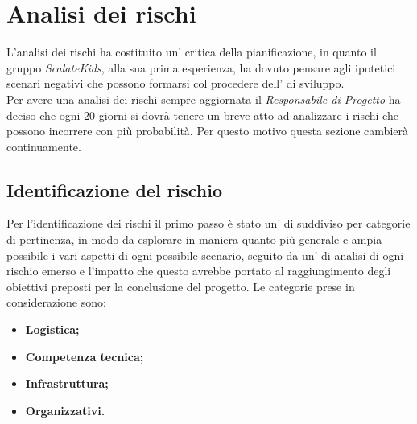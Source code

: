 \documentclass{scalatekids-article}
\begin{document}
\section{Analisi dei rischi}
L'analisi dei rischi ha costituito un' critica della pianificazione, in
quanto il gruppo \textit{ScalateKids}, alla sua prima esperienza, ha dovuto pensare agli ipotetici
scenari negativi che possono formarsi col procedere dell' di sviluppo.\\
Per avere una analisi dei rischi sempre aggiornata il \textit{Responsabile di Progetto} ha deciso che ogni 20 giorni si dovrà tenere un breve  atto ad analizzare i rischi che possono incorrere con più probabilità. Per questo motivo questa sezione cambierà continuamente.\\
\subsection{Identificazione del rischio}
Per l'identificazione dei rischi il primo passo è stato un' di
 suddiviso per categorie di pertinenza, in modo da esplorare
in maniera quanto più generale e ampia possibile i vari aspetti di ogni
possibile scenario, seguito da un' di analisi di ogni rischio emerso e
l'impatto che questo avrebbe portato al raggiungimento degli obiettivi preposti
per la conclusione del progetto. Le categorie prese in considerazione sono:
\begin{itemize}
\item\textbf{Logistica;}
\item\textbf{Competenza tecnica;}
\item\textbf{Infrastruttura;}
\item\textbf{Organizzativi.}
\end{itemize}
\end{document}
